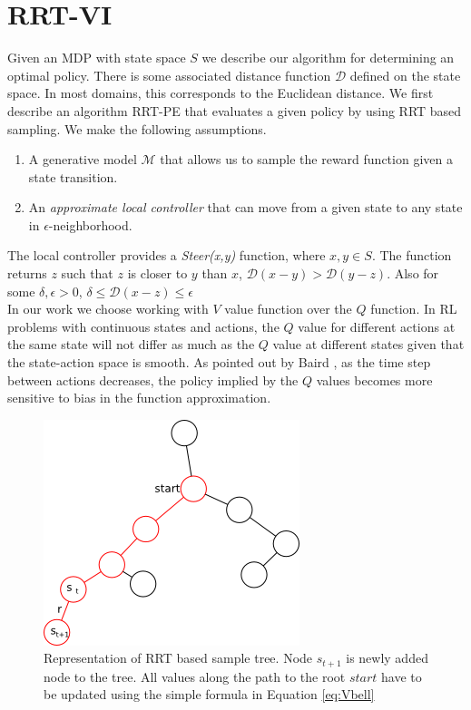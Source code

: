 \documentclass{article} %
\begin{document}
\section{RRT-VI}
Given an MDP with state space $S$ we describe our algorithm for determining an optimal policy. There is some associated distance function $\mathcal{D} $ defined on the state space. In most domains, this corresponds to the Euclidean distance. We first describe an algorithm RRT-PE that evaluates a given policy by using RRT based sampling.
We make the following assumptions.
\begin{enumerate}
\item A generative model $\mathcal{M}$ that allows us to sample the reward function given a state transition.
\item An \textit{approximate local controller} that can move from a given state to any state in $\epsilon$-neighborhood.
\end{enumerate}
The local controller provides a \emph{Steer(x,y)} function, where $x,y\in S$. The function returns $z$ such that $z$ is closer to $y$ than $x$, $\mathcal{D}(x-y) > \mathcal{D}(y-z)$. Also for some $\delta,\epsilon > 0$, $\delta \leq \mathcal{D}(x-z) \leq \epsilon$\\

In our work we choose working with $V$ value function over the $Q$ function. In RL problems with continuous states and actions, the $Q$ value for different actions at the same state will not differ as much as the $Q$ value at different states given that the state-action space is smooth. As pointed out by Baird , as the time step between actions decreases, the policy implied by the $Q$ values becomes more sensitive to bias in the function approximation\citep{bairdadvantage}.\\
\begin{figure}[htb]
\centering
\label{fig:backup}
\includegraphics[scale=0.7]{backup.png}
\caption{Representation of RRT based sample tree. Node $s_{t+1}$ is newly added node to the tree. All values along the path to the root $start$ have to be updated using the simple formula in Equation \ref{eq:Vbell} }
\end{figure}
\end{document}
